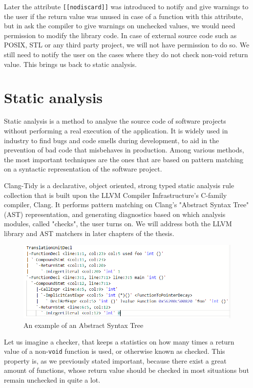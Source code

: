 Later the attribute \texttt{[[nodiscard]]} \cite{cppreferencenodiscard} was introduced to notify and give warnings to the user if the return value was unused in case
of a function
with this attribute, but in ask the compiler to give warnings on unchecked values, we would need permission to modify the library code.
In case of external source code such as POSIX, STL or any third party project, we will not have permission to do so.
We still need to notify the user on the cases where they do not check non-void return value. This brings us back to static analysis.

\section{Static analysis}

Static analysis is a method to analyse the source code of software projects without performing a real execution of the application.
It is widely used in industry to find bugs and code smells during development, to aid in the prevention of bad code that misbehaves in
production.
Among various methods, the most important techniques are the ones that are based on pattern matching on a syntactic representation of
the software project.

Clang-Tidy is a declarative, object oriented, strong typed static analysis rule collection that is built upon the LLVM Compiler
Infrastructure's C-family compiler, Clang.
It performs pattern matching on Clang's "Abstract Syntax Tree" (AST) representation, and generating diagnostics based on which analysis
modules, called "checks", the user turns on. We will address both the LLVM library and AST matchers in later chapters of the thesis.


\begin{figure}
    \includegraphics[width=\linewidth]{images/random_ast_example.png}
	\caption{An example of an Abstract Syntax Tree} %
\end{figure}

Let us imagine a checker, that keeps a statistics on how many times a return value of a non-\texttt{void} function is used, or otherwise known
as checked. This property is, as we previously stated important, because there exist a great amount of functions,
whose return value should be checked in most situations but remain unchecked in quite a lot.

